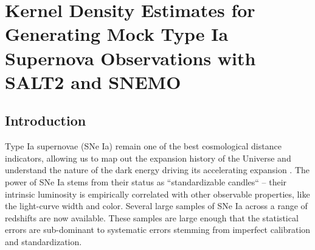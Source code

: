 \chapter{Kernel Density Estimates for Generating Mock Type Ia Supernova Observations with SALT2 and SNEMO}

\section{Introduction}
Type Ia supernovae (SNe Ia) remain one of the best cosmological distance indicators, allowing us to map out the expansion history of the Universe and understand the nature of the dark energy driving its accelerating expansion \citep{Perlmutter1999, Riess1998}. The power of SNe Ia stems from their status as ``standardizable candles`` -- their intrinsic luminosity is empirically correlated with other observable properties, like the light-curve width and color. Several large samples of SNe Ia across a range of redshifts are now available. These samples are large enough that the statistical errors are sub-dominant to systematic errors stemming from imperfect calibration and standardization.

